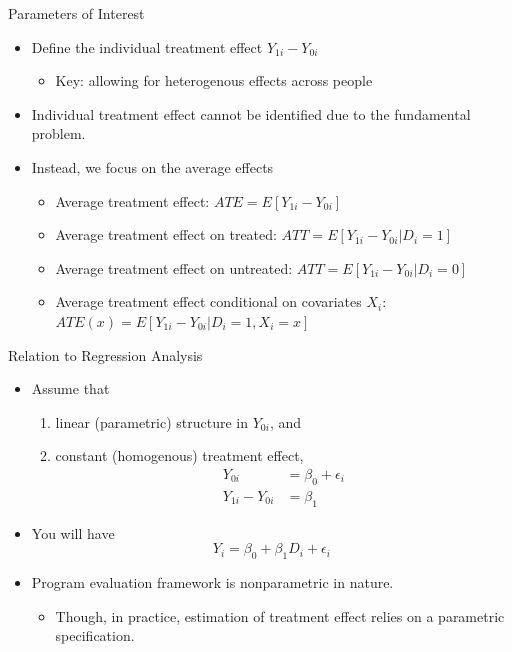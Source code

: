 \documentclass[
  ignorenonframetext,
]{beamer}
\providecommand{\tightlist}{%
  \setlength{\itemsep}{0pt}\setlength{\parskip}{0pt}}
\begin{document}
\begin{frame}{Parameters of Interest}
\protect\hypertarget{parameters-of-interest}{}
\begin{itemize}
\item
  Define the individual treatment effect \(Y_{1i}-Y_{0i}\)

  \begin{itemize}
  \tightlist
  \item
    Key: allowing for heterogenous effects across people
  \end{itemize}
\item
  Individual treatment effect cannot be identified due to the
  fundamental problem.
\item
  Instead, we focus on the average effects

  \begin{itemize}
  \item
    Average treatment effect: \(ATE=E[Y_{1i}-Y_{0i}]\)
  \item
    Average treatment effect on treated:
    \(ATT=E[Y_{1i}-Y_{0i}|D_{i}=1]\)
  \item
    Average treatment effect on untreated:
    \(ATT=E[Y_{1i}-Y_{0i}|D_{i}=0]\)
  \item
    Average treatment effect conditional on covariates \(X_{i}\):
    \(ATE(x)=E[Y_{1i}-Y_{0i}|D_{i}=1,X_{i}=x]\)
  \end{itemize}
\end{itemize}
\end{frame}

\begin{frame}{Relation to Regression Analysis}
\protect\hypertarget{relation-to-regression-analysis}{}
\begin{itemize}
\item
  Assume that

  \begin{enumerate}
  \item
    linear (parametric) structure in \(Y_{0i}\), and
  \item
    constant (homogenous) treatment effect, \[\begin{aligned}
    Y_{0i} & =\beta_{0}+\epsilon_{i}\\
    Y_{1i}-Y_{0i} & =\beta_{1}\end{aligned}\]
  \end{enumerate}
\item
  You will have \[Y_{i}=\beta_{0}+\beta_{1}D_{i}+\epsilon_{i}\]
\item
  Program evaluation framework is nonparametric in nature.

  \begin{itemize}
  \tightlist
  \item
    Though, in practice, estimation of treatment effect relies on a
    parametric specification.
  \end{itemize}
\end{itemize}
\end{frame}
\end{document}
